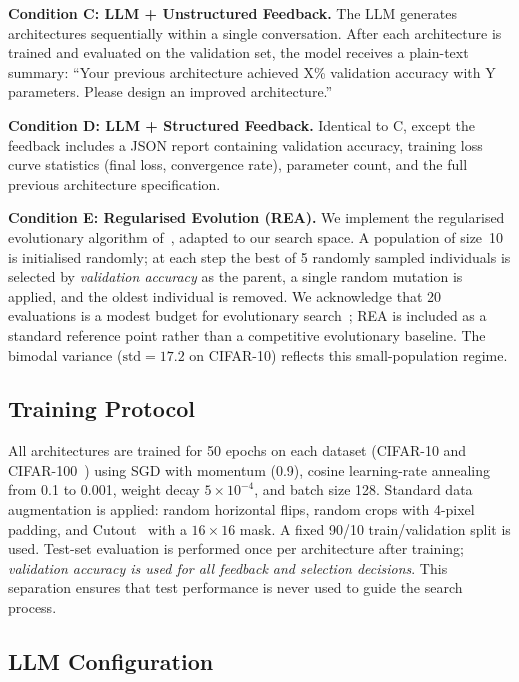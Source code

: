 \documentclass[10pt]{article}
\begin{document}
\textbf{Condition C: LLM + Unstructured Feedback.}
The LLM generates architectures sequentially within a single conversation.  After
each architecture is trained and evaluated on the validation set, the model
receives a plain-text summary: ``Your previous architecture achieved X\%
validation accuracy with Y parameters.  Please design an improved architecture.''

\textbf{Condition D: LLM + Structured Feedback.}
Identical to C, except the feedback includes a JSON report containing
validation accuracy, training loss curve statistics (final loss, convergence
rate), parameter count, and the full previous architecture specification.

\textbf{Condition E: Regularised Evolution (REA).}
We implement the regularised evolutionary algorithm
of~\citet{real2019regularized}, adapted to our search space.  A population of
size~10 is initialised randomly; at each step the best of 5 randomly sampled
individuals is selected by \emph{validation accuracy} as the parent, a single
random mutation is applied, and the oldest individual is removed.  We
acknowledge that 20 evaluations is a modest budget for evolutionary
search~\citep{stanley2019designing}; REA is included as a standard reference
point rather than a competitive evolutionary baseline.  The bimodal variance
($\text{std}{=}17.2$ on CIFAR-10) reflects this small-population regime.

\subsection{Training Protocol}
\label{sec:training}

All architectures are trained for 50 epochs on each dataset
(CIFAR-10 and CIFAR-100~\citep{krizhevsky2009cifar}) using SGD with momentum
(0.9), cosine learning-rate annealing from 0.1 to 0.001, weight decay
$5{\times}10^{-4}$, and batch size 128.  Standard data augmentation is applied:
random horizontal flips, random crops with 4-pixel padding, and
Cutout~\citep{devries2017cutout} with a $16{\times}16$ mask.  A fixed 90/10
train/validation split is used.  Test-set evaluation is performed once per
architecture after training; \emph{validation accuracy is used for all
feedback and selection decisions}.  This separation ensures that test performance
is never used to guide the search process.

\subsection{LLM Configuration}
\label{sec:llmconfig}
\end{document}
